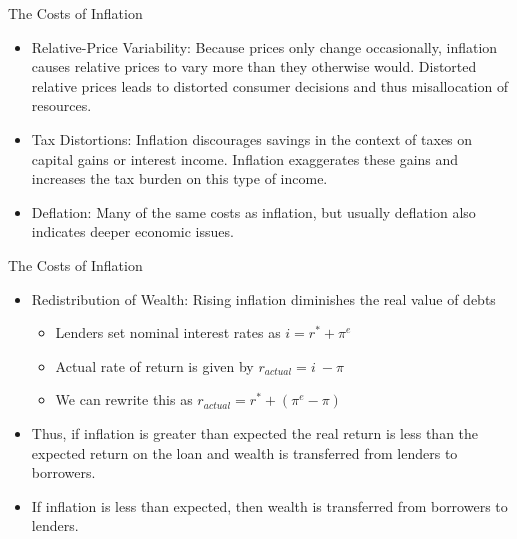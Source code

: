\documentclass[xcolor={dvipsnames},pdf, hyperref={colorlinks=true, citecolor=ForestGreen, linkcolor=BlueViolet, urlcolor=Magenta}]{beamer}
\theoremstyle{definition}
\begin{document}
\begin{frame}{The Costs of Inflation}
	\begin{itemize}
	\item Relative-Price Variability: Because prices only change occasionally, inflation causes relative prices to vary more than they otherwise would. Distorted relative prices leads to distorted consumer decisions and thus misallocation of resources.
		\item Tax Distortions: Inflation discourages savings in the context of taxes on capital gains or interest income. Inflation  exaggerates these gains and increases the tax burden on this type of income.
	\item Deflation: Many of the same costs as inflation, but usually deflation also indicates deeper economic issues.
	\end{itemize}
\end{frame}

\begin{frame}{The Costs of Inflation}
	\begin{itemize}
	\item Redistribution of Wealth: Rising inflation diminishes the real value of debts 
	\begin{itemize}
	\item Lenders set nominal interest rates as $i = r^* + \pi^e$
	\item Actual rate of return is given by $r_{actual} = i\ - \pi$ 
	\item We can rewrite this as $r_{actual} = r^* + (\pi^e - \pi)$
	\end{itemize}
	\item Thus, if inflation is greater than expected the real return is less than the expected return on the loan and wealth is transferred from lenders to borrowers. \item If inflation is less than expected, then wealth is transferred from borrowers to lenders.
	\end{itemize}
\end{frame}
\end{document}
